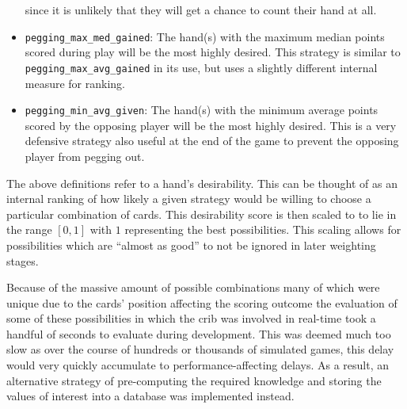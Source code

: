 \begin{itemize}
	since it is unlikely that they will get a chance to count their hand at all.
\item \texttt{pegging\_max\_med\_gained}:
	The hand(s) with the maximum median points scored during play will be the most
	highly desired.
	This strategy is similar to \texttt{pegging\_max\_avg\_gained} in its use,
	but uses a slightly different internal measure for ranking.
\item \texttt{pegging\_min\_avg\_given}:
	The hand(s) with the minimum average points scored by the opposing player
	will be the most highly desired.
	This is a very defensive strategy also useful at the end of the game to
	prevent the opposing player from pegging out.
\end{itemize}
%
The above definitions refer to a hand's desirability.
%
This can be thought of as an internal ranking of how likely a given strategy
would be willing to choose a particular combination of cards.
%
This desirability score is then scaled to to lie in the range $[0, 1]$ with
$1$ representing the best possibilities.
%
This scaling allows for possibilities which are ``almost as good'' to not be
ignored in later weighting stages.




Because of the massive amount of possible combinations%
\textemdash many of which were unique due to the cards' position affecting the
scoring outcome\textemdash%
the evaluation of some of these possibilities in which the crib was involved
in real-time took a handful of seconds to evaluate during development.
%
This was deemed much too slow as over the course of hundreds or thousands of
simulated games,
this delay would very quickly accumulate to performance-affecting delays.
%
As a result, an alternative strategy of pre-computing the required knowledge and
storing the values of interest into a database was implemented instead.

